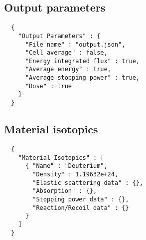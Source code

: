\subsection{Output parameters}
\begin{verbatim}
  {
    "Output Parameters" : {
      "File name" : "output.json",
      "Cell average" : false,
      "Energy integrated flux" : true,
      "Average energy" : true,
      "Average stopping power" : true,
      "Dose" : true
    }
  }
\end{verbatim}

\subsection{Material isotopics}
\begin{verbatim}
  {
    "Material Isotopics" : [
      { "Name" : "Deuterium",
        "Density" : 1.19632e+24,
        "Elastic scattering data" : {},
        "Absorption" : {},
        "Stopping power data" : {},
        "Reaction/Recoil data" : {}
      }
    ]
  }
\end{verbatim}